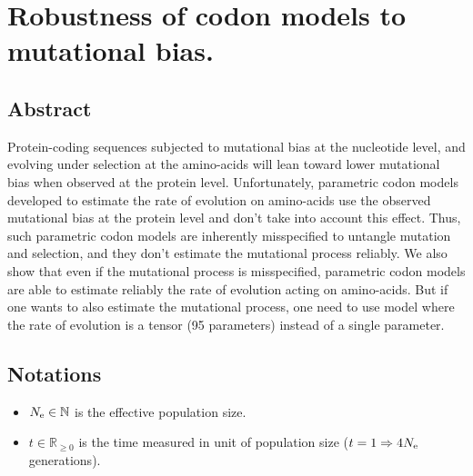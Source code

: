 \chapter{Robustness of codon models to mutational bias.}
\minitoc
\section{Abstract}

Protein-coding sequences subjected to mutational bias at the nucleotide level, and evolving under selection at the amino-acids will lean toward lower mutational bias when observed at the protein level. Unfortunately, parametric codon models developed to estimate the rate of evolution on amino-acids use the observed mutational bias at the protein level and don't take into account this effect. Thus, such parametric codon models are inherently misspecified to untangle mutation and selection, and they don't estimate the mutational process reliably. We also show that even if the mutational process is misspecified, parametric codon models are able to estimate reliably the rate of evolution acting on amino-acids. But if one wants to also estimate the mutational process, one need to use model where the rate of evolution is a tensor (95 parameters) instead of a single parameter.

\section{Notations}

\begin{itemize}
	\item $N_{\textrm{e}} \in \mathbb{N}$ is the effective population size.
	\item $t \in \mathbb{R}_{\geq 0}$ is the time measured in unit of population size ($t=1 \Rightarrow 4 N_{\textrm{e}} $ generations).
\end{itemize}

